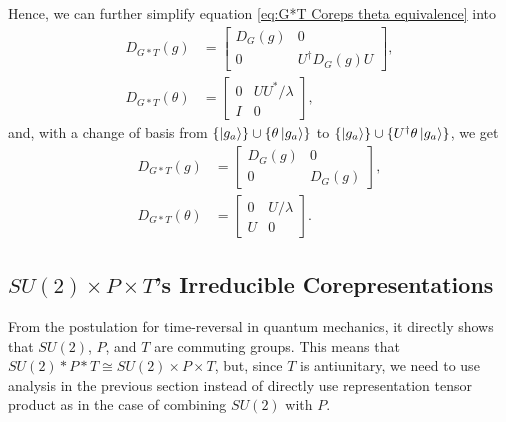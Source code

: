 \documentclass[preprint, 12pt]{revtex4-2}
\numberwithin{equation}{section}
\begin{document}
Hence, we can further simplify equation \ref{eq:G*T Coreps theta equivalence} into
\begin{equation}\label{eq:G*T Coreps simplify}
    \begin{aligned}
        D_{G\ast T}(g) &=   \begin{bmatrix}
                                D_{G}(g) & 0 \\
                                0 & U^\dagger D_G(g)U  
                            \end{bmatrix}, \\
        D_{G\ast T}(\theta) &=  \begin{bmatrix}
                                    0 & UU^\ast/\lambda \\
                                    I & 0 
                                \end{bmatrix},
    \end{aligned}
\end{equation}
and, with a change of basis from $\{\ket{g_a}\}\cup\{\theta\ket{g_a}\}$ to $\{\ket{g_a}\}\cup\{U^\dagger\theta\ket{g_a}\}$, we get
\begin{equation}\label{eq:G*T Coreps simplify change basis}
    \begin{aligned}
        D_{G\ast T}(g) &=   \begin{bmatrix}
                                D_{G}(g) & 0 \\
                                0 & D_G(g)  
                            \end{bmatrix}, \\
        D_{G\ast T}(\theta) &=  \begin{bmatrix}
                                    0 & U/\lambda \\
                                    U & 0 
                                \end{bmatrix}.
    \end{aligned}
\end{equation}

\subsection{$SU(2)\times P\times T$'s Irreducible Corepresentations}
From the postulation for time-reversal in quantum mechanics, it directly shows that $SU(2)$, $P$, and $T$ are commuting groups. This means that $SU(2)\ast P\ast T\cong SU(2)\times P\times T$, but, since $T$ is antiunitary, we need to use analysis in the previous section instead of directly use representation tensor product as in the case of combining $SU(2)$ with $P$.
\end{document}
